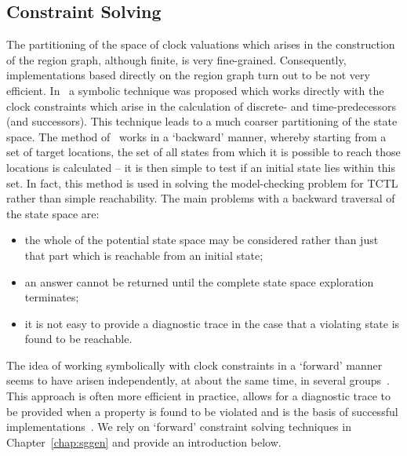 {\subsection{Constraint Solving}\label{ss:mscconstraint}
The partitioning of the space of clock valuations which arises in the
construction of the region graph, although finite, is very
fine-grained.  Consequently, implementations based directly on the
region graph turn out to be not very efficient. In~\cite{hnsy:94} a
symbolic technique was proposed which works directly with the clock
constraints which arise in the calculation of discrete- and
time-predecessors (and successors). This technique leads to a much
coarser partitioning of the state space. The method of~\cite{hnsy:94}
works in a `backward' manner, whereby starting from a set of target
locations, the set of all states from which it is possible to reach
those locations is calculated -- it is then simple to test if an
initial state lies within this set. In fact, this method is used in
solving the model-checking problem for TCTL rather than simple
reachability. The main problems with a backward traversal of the state space
are:
\begin{itemize}
\item the whole of the potential state space may be considered rather than
just that part which is reachable from an initial state;
\item an answer cannot be returned until the complete state space 
exploration terminates;
\item it is not easy to provide a diagnostic trace in the case that a 
violating state is found to be reachable.
\end{itemize}
The idea of working symbolically with clock constraints
in a `forward' manner seems to have arisen independently, at about the
same time, in several groups~\cite{acd:92,oli:94,ypd:94}. This approach
is often more efficient in practice, allows for a diagnostic trace to be
provided when a property is found to be violated and is the basis of 
successful implementations~\cite{bll:95,dot:95}. We rely on `forward'
constraint solving techniques in Chapter~\ref{chap:sggen} and provide an
introduction below.  

}
